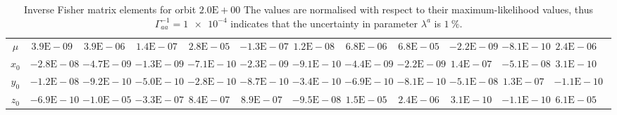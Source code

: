 \begin{sidewaystable}[htbp]
\begin{tabular}{cD{.}{.}{2.5}D{.}{.}{2.5}D{.}{.}{2.5}D{.}{.}{2.5}D{.}{.}{2.5}D{.}{.}{2.5}D{.}{.}{2.5}D{.}{.}{2.5}D{.}{.}{2.5}D{.}{.}{2.5}D{.}{.}{2.5}c}
$\mu$ & $3.9\mathrm{E}-09$ & $3.9\mathrm{E}-06$ & $1.4\mathrm{E}-07$ & $2.8\mathrm{E}-05$ & $-1.3\mathrm{E}-07$ & $1.2\mathrm{E}-08$ & $6.8\mathrm{E}-06$ & $6.8\mathrm{E}-05$ & $-2.2\mathrm{E}-09$ & $-8.1\mathrm{E}-10$ & $2.4\mathrm{E}-06$ \\
$x_0$ & $-2.8\mathrm{E}-08$ & $-4.7\mathrm{E}-09$ & $-1.3\mathrm{E}-09$ & $-7.1\mathrm{E}-10$ & $-2.3\mathrm{E}-09$ & $-9.1\mathrm{E}-10$ & $-4.4\mathrm{E}-09$ & $-2.2\mathrm{E}-09$ & $1.4\mathrm{E}-07$ & $-5.1\mathrm{E}-08$ & $3.1\mathrm{E}-10$ \\
$y_0$ & $-1.2\mathrm{E}-08$ & $-9.2\mathrm{E}-10$ & $-5.0\mathrm{E}-10$ & $-2.8\mathrm{E}-10$ & $-8.7\mathrm{E}-10$ & $-3.4\mathrm{E}-10$ & $-6.9\mathrm{E}-10$ & $-8.1\mathrm{E}-10$ & $-5.1\mathrm{E}-08$ & $1.3\mathrm{E}-07$ & $-1.1\mathrm{E}-10$ \\
$z_0$ & $-6.9\mathrm{E}-10$ & $-1.0\mathrm{E}-05$ & $-3.3\mathrm{E}-07$ & $8.4\mathrm{E}-07$ & $8.9\mathrm{E}-07$ & $-9.5\mathrm{E}-08$ & $1.5\mathrm{E}-05$ & $2.4\mathrm{E}-06$ & $3.1\mathrm{E}-10$ & $-1.1\mathrm{E}-10$ & $6.1\mathrm{E}-05$
\bottomrule
\end{tabular}
\caption{Inverse Fisher matrix elements for orbit $2.0\mathrm{E}+00$ The values are normalised with respect to their maximum-likelihood values, thus $\Gamma^{-1}_{aa} = \num{1e-4}$ indicates that the uncertainty in parameter $\lambda^a$ is $\SI{1}{\percent}$.}
\label{tab:Fisher_2}
\end{sidewaystable}
